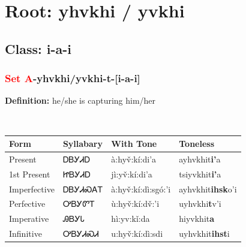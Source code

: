 \needspace{4in}
\section*{Root: yhvkhi / yvkhi}
\nopagebreak
{}
\needspace{3in}
\subsection*{Class: i-a-i}
\nopagebreak
\needspace{2in}
\subsubsection*{\textcolor{Red}{Set A}{-}\textbf{yhvkhi/yvkhi}{-}t{-}[i-a-i]}
\nopagebreak
\textbf{Definition: } he/she is capturing him/her
\\[0.5em]
\begin{tabularx}{\textwidth}{l X X X}%
\toprule%
\textbf{Form}&\textbf{Syllabary}&\textbf{With Tone}&\textbf{Toneless}\\%
\midrule%
Present&ᎠᏴᎩᏗᎠ&à:hyv̌:kí:di’a&ayhvkhit\textbf{i'}a\\%
1st Present&ᏥᏴᎩᏗᎠ&jì:yv̌:kí:di’a&tsiyvkhit\textbf{i'}a\\%
Imperfective&ᎠᏴᎩᏗᏍᎪᎢ&à:hyv̌:kí:dì:sgó:’i&ayhvkhit\textbf{ihsk}o'i\\%
Perfective&ᎤᏴᎩᏛᎢ&ù:hyv̌:kí:dv̌:’i&uyhvkhi\textbf{t}v'i\\%
Imperative&ᎯᏴᎩᏓ&hì:yv:kǐ:da&hiyvkhit\textbf{a}\\%
Infinitive&ᎤᏴᎩᏗᏍᏗ&u:hyv̌:kí:dì:sdi&uyhvkhit\textbf{ihst}i\\%
\bottomrule%
\end{tabularx}
\\[1em]